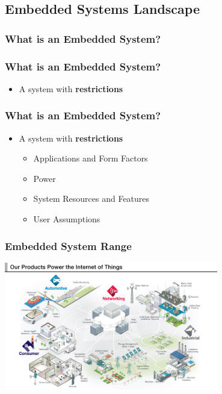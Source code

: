 \subsection[Big Picture]{Embedded Systems Landscape}

\begin{frame}
  \frametitle{What is an Embedded System?}
\end{frame}
\begin{frame}
  \frametitle{What is an Embedded System?}
  \begin{itemize}
    \item A system with \bf{restrictions}
  \end{itemize}
\end{frame}

\begin{frame}
  \frametitle{What is an Embedded System?}
  \begin{itemize}
    \item A system with {\bf restrictions}
    \begin{itemize}
      \item Applications and Form Factors
      \item Power
      \item System Resources and Features
      \item User Assumptions
    \end{itemize}
  \end{itemize}
\end{frame}

\begin{frame}
  \frametitle{Embedded System Range}
  \begin{center}
    \includegraphics[width=0.7\textwidth]{slides/te5009-embedded-systems-landscape/OPPIOT_BD.jpg}
  \end{center}
\end{frame}
